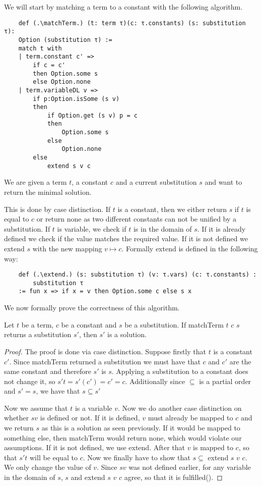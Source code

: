 We will start by matching a term to a constant with the following algorithm.

\begin{lstlisting}
    def (.\matchTerm.) (t: term τ)(c: τ.constants) (s: substitution τ):
    Option (substitution τ) :=
    match t with
    | term.constant c' =>
        if c = c'
        then Option.some s
        else Option.none
    | term.variableDL v =>
        if p:Option.isSome (s v)
        then  
            if Option.get (s v) p = c
            then
                Option.some s
            else
                Option.none
        else
            extend s v c
\end{lstlisting}

We are given a term $t$, a constant $c$ and a current substitution $s$ and want to return the minimal solution.

This is done by case distinction. If $t$ is a constant, then we either return $s$ if $t$ is equal to $c$ or return none as two different constants can not be unified by a substitution. If $t$ is variable, we check if $t$ is in the domain of $s$. If it is already defined we check if the value matches the required value. If it is not defined we extend $s$ with the new mapping $v \mapsto c$.
Formally extend is defined in the following way:

\begin{lstlisting}
    def (.\extend.) (s: substitution τ) (v: τ.vars) (c: τ.constants) :
        substitution τ 
    := fun x => if x = v then Option.some c else s x
\end{lstlisting}

We now formally prove the correctness of this algorithm. 

\begin{lemma}[\matchTermFindsSolution]
    Let $t$ be a term, $c$ be a constant and $s$ be a substitution. If matchTerm $t$ $c$ $s$ returns a substitution $s'$, then $s'$ is a solution.
\end{lemma}
\begin{proof}
The proof is done via case distinction. Suppose firstly that $t$ is a constant $c'$. Since matchTerm returned a substitution we must have that $c$ and $c'$ are the same constant and therefore $s'$ is $s$. Applying a substitution to a constant does not change it, so $s' t = s' (c') = c' = c$. Additionally since $\subseteq$ is a partial order and $s' = s$, we have that $s \subseteq s'$

Now we assume that $t$ is a variable $v$. Now we do another case distinction on whether $s v$ is defined or not. If it is defined, $v$ must already be mapped to $c$ and we return $s$ as this is a solution as seen previously. If it would be mapped to something else, then matchTerm would return none, which would violate our assumptions.
If it is not defined, we use extend. After that $v$ is mapped to $c$, so that $s' t$ will be equal to $c$. Now we finally have to show that $s \subseteq$ extend $s$ $v$ $c$. We only change the value of $v$. Since $s v$ was not defined earlier, for any variable in the domain of $s$, $s$ and extend $s$ $v$ $c$ agree, so that it is fulfilled(\ssubsetextends).
\end{proof}

